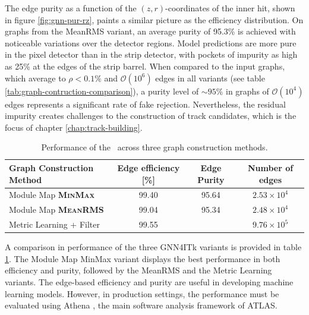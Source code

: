 The edge purity as a function of the $(z,r)$-coordinates of the inner hit, shown in figure \ref{fig:gnn-pur-rz}, paints a similar picture as the efficiency distribution.
On graphs from the MeanRMS variant, an average purity of 95.3\% is achieved with noticeable variations over the detector regions.
Model predictions are more pure in the pixel detector than in the strip detector, with pockets of impurity as high as 25\% at the edges of the strip barrel. 
When compared to the input graphs, which average to $\rho <0.1\%$ and $\mathcal{O}(10^6)$ edges in all variants (see table \ref{tab:graph-contruction-comparison}), a purity level of $\sim 95\%$ in graphs of $\mathcal{O}(10^4)$ edges represents a significant rate of fake rejection. 
Nevertheless, the residual impurity creates challenges to the construction of track candidates, which is the focus of chapter \ref{chap:track-building}.

\begin{table}[h!]
    \centering
    \begin{tabular}{l|c|c|c}
      Graph Construction Method  & Edge efficiency [\%] & Edge Purity & Number of edges  \\
      \hline \hline
        Module Map \textbf{\textsc{MinMax}} & 99.40 & 95.64 & $2.53\times 10^4$ \\
        Module Map \textbf{\textsc{MeanRMS}} & 99.04  & 95.34 & $2.48\times 10^4$ \\
        Metric Learning + Filter & 99.55  & & $9.76\times 10^5$\\
        \hline
    \end{tabular}
    \caption{Performance of the \ignn~across three graph construction methods. }
    \label{tab:edge-classification-comparison}
\end{table}

A comparison in performance of the three GNN4ITk variants is provided in table \ref{tab:edge-classification-comparison}.
The {Module Map MinMax} variant displays the best performance in both efficiency and purity, followed by the MeanRMS and the Metric Learning variants.
The edge-based efficiency and purity are useful in developing machine learning models. 
However, in production settings, the performance must be evaluated using Athena \cite{atlas_collaboration_2021_4772550}, the main software analysis framework of ATLAS.


